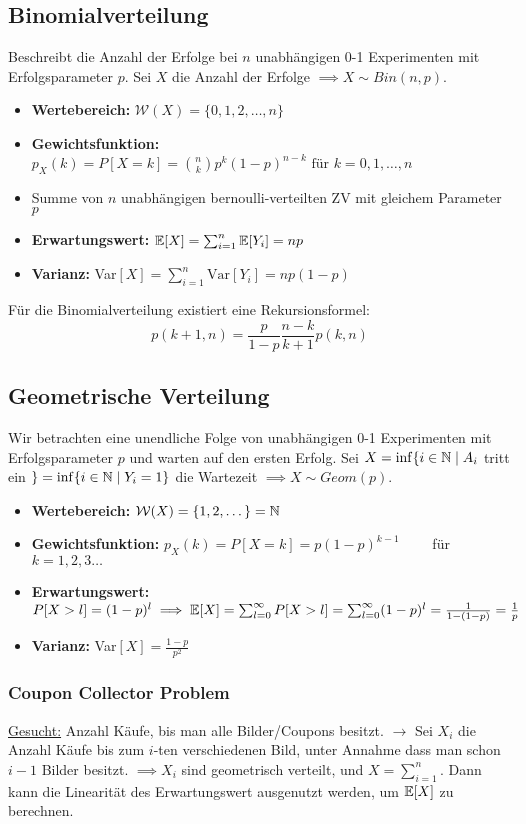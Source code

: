 \subsection{Binomialverteilung}
Beschreibt die Anzahl der Erfolge bei $n$ unabhängigen 0-1 Experimenten mit Erfolgsparameter $p$. Sei $X$ die Anzahl der Erfolge $\implies X \sim Bin(n,p)$.
\begin{itemize}
\item \textbf{Wertebereich:} $\mathcal{W}(X) = \{0,1,2,\dots,n\}$
\item \textbf{Gewichtsfunktion:} $p_X(k) = P[X=k] = \binom{n}{k} p^k (1-p)^{n-k} \text{ für } k = 0,1,\dots, n$
\item Summe von $n$ unabhängigen bernoulli-verteilten ZV mit gleichem Parameter $p$
\item \textbf{Erwartungswert:} $\mathbb{E}[X] = \sum_{i=1}^n \mathbb{E}[Y_i] = np$
\item \textbf{Varianz:} Var$[X] = \sum_{i=1}^n \mbox{Var}[Y_i] = np(1-p)$
\end{itemize}
Für die Binomialverteilung existiert eine Rekursionsformel:
$$p(k+1, n) = \frac{p}{1-p} \frac{n-k}{k+1} p(k,n)$$

\subsection{Geometrische Verteilung}
Wir betrachten eine unendliche Folge von unabhängigen 0-1 Experimenten mit Erfolgsparameter $p$ und warten auf den ersten Erfolg. Sei $X = \inf \{i\in\mathbb{N} \;|\; A_i$ tritt ein $\} = \inf \{i \in \mathbb{N} \;|\; Y_i = 1\}$ die Wartezeit $\implies X \sim Geom(p)$.
\begin{itemize}
\item \textbf{Wertebereich:} $\mathcal{W}(X)=\{1,2,\dots\} = \mathbb{N}$
\item \textbf{Gewichtsfunktion:} $p_X(k) = P[X=k] = p(1-p)^{k-1} \quad \quad $ für $k=1,2,3\dots $
\item \textbf{Erwartungswert:} $P[X > l] = (1-p)^l\\\implies \mathbb{E}[X] = \sum_{l=0}^\infty P[X>l] = \sum_{l=0}^\infty (1-p)^l = \frac{1}{1-(1-p)} = \frac{1}{p}$
\item \textbf{Varianz:} Var$[X] = \frac{1-p}{p^2}$
\end{itemize}

\begin{mdframed}
\subsubsection*{Coupon Collector Problem}
\underline{Gesucht:} Anzahl Käufe, bis man alle Bilder/Coupons besitzt. $\to$ Sei $X_i$ die Anzahl Käufe bis zum $i$-ten verschiedenen Bild, unter Annahme dass man schon $i-1$ Bilder besitzt. $\implies X_i$ sind geometrisch verteilt, und $X= \sum_{i=1}^n$. Dann kann die Linearität des Erwartungswert ausgenutzt werden, um $\mathbb{E}[X]$ zu berechnen.
\end{mdframed}

